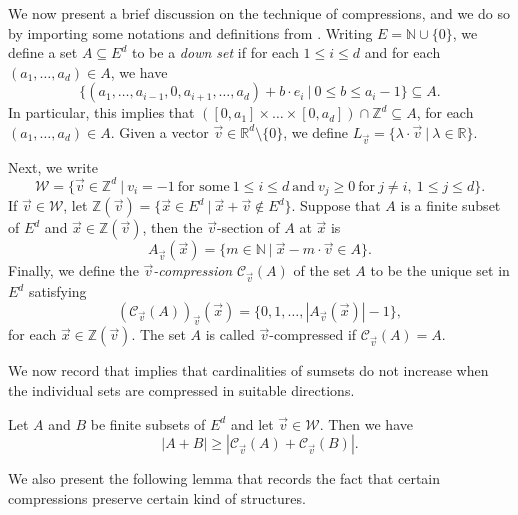 We now present a brief discussion on the technique of compressions, and we do so by importing some notations and definitions from \cite{GG2001}. Writing $E = \mathbb{N} \cup \{0\}$, we define a set $A \subseteq E^d$ to be a \emph{down set} if for each $1 \leq i \leq d$ and for each $(a_1, \dots, a_d) \in A$, we have
\[ \{ (a_1, \dots, a_{i-1}, 0, a_{i+1}, \dots, a_d) + b \cdot e_i \ | \ 0 \leq b \leq a_i -1 \} \subseteq A. \]
In particular, this implies that $([0, a_1] \times \dots \times [0, a_d]) \cap \mathbb{Z}^d \subseteq A$, for each $(a_1, \dots, a_d) \in A$. Given a vector $\vec{v} \in \mathbb{R}^d \setminus \{0\}$, we define $L_{\vec{v}} = \{ \lambda \cdot \vec{v} \ | \ \lambda \in \mathbb{R} \}$.
\par

Next, we write 
\[ \mathcal{W} = \{ \vec{v} \in \mathbb{Z}^d \ | \ v_i = - 1 \ \text{for some} \ 1 \leq i \leq d \ \text{and} \ v_j \geq 0 \ \text{for} \ j \neq i, \ 1 \leq j \leq d \}. \]
If $\vec{v} \in \mathcal{W}$, let $\mathbb{Z}(\vec{v}) = \{ \vec{x} \in E^d \ | \ \vec{x} + \vec{v} \notin E^d \}$. Suppose that $A$ is a finite subset of $E^d$ and $\vec{x} \in \mathbb{Z}(\vec{v})$, then the $\vec{v}$-section of $A$ at $\vec{x}$ is 
\[ A_{\vec{v}}(\vec{x}) = \{ m \in \mathbb{N} \ | \ \vec{x} - m \cdot \vec{v} \in A\}. \]
Finally, we define the \emph{$\vec{v}$-compression} $\mathcal{C}_{\vec{v}}(A)$ of the set $A$ to be the unique set in $E^d$ satisfying
\[ (\mathcal{C}_{\vec{v}}(A))_{\vec{v}}(\vec{x}) = \{ 0, 1, \dots, |A_{\vec{v}}(\vec{x}) | - 1\}, \]
for each $\vec{x} \in \mathbb{Z}(\vec{v})$. The set $A$ is called $\vec{v}$-compressed if $\mathcal{C}_{\vec{v}}(A) = A$.
\par

We now record \cite[Corollary $3.5$]{GG2001} that implies that cardinalities of sumsets do not increase when the individual sets are compressed in suitable directions.

\begin{lemma} \label{gardc}
Let $A$ and $B$ be finite subsets of $E^d$ and let $\vec{v} \in \mathcal{W}$. Then we have
\[ |A+B| \geq |\mathcal{C}_{\vec{v}}(A) + \mathcal{C}_{\vec{v}}(B)|. \]
\end{lemma}


We also present the following lemma that records the fact that certain compressions preserve certain kind of structures.

